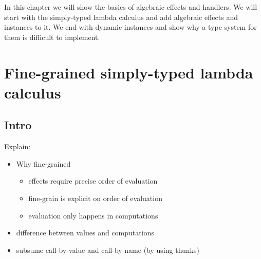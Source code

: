 {
\newcommand\ty[0]{\tau}
\newcommand\tunit[0]{()}
\newcommand\tarr[2]{#1 \rightarrow #2}
\newcommand\thandler[2]{#1 \Rightarrow #2}
\newcommand\tforall[3]{\forall(#1:#2) . #3}

\newcommand\cty[0]{\underline{\ty}}
\newcommand\aty[2]{#1 \; ! \; #2}
\newcommand\texists[3]{\exists(#1:#2) . #3}
\newcommand\texistss[2]{\exists \overrightarrow{#1} . #2}

\newcommand\val[0]{\nu}
\newcommand\vunit[0]{()}
\newcommand\vinst[1]{\mathsf{inst}(#1)}
\newcommand\vabst[3]{\Lambda(#1:#2) . #3}
\newcommand\vabs[2]{\lambda #1 . #2}
\newcommand\vappt[2]{#1 \; [ #2 ]}
\newcommand\vhandler[1]{\textit{handler} \; \{#1\}}
\newcommand\vhandleri[2]{\textit{handler} ( #1 ) \; \{#2\}}
\newcommand\vhandlerc[0]{\vhandler{
	\textit{return} \; x \rightarrow \comp,
	\op_1(x ; k) \rightarrow \comp,
	...,
	\op_n(x ; k) \rightarrow \comp
}}
\newcommand\vhandlerci[1]{\vhandleri{#1}{
	\textit{return} \; x \rightarrow \comp,
	\op_1(x ; k) \rightarrow \comp,
	...,
	\op_n(x ; k) \rightarrow \comp
}}

\newcommand\comp[0]{c}
\newcommand\creturn[1]{\textit{return} \; #1}
\newcommand\capp[2]{#1 \; #2}
\newcommand\cdo[3]{#1 \leftarrow #2 ; #3}
\newcommand\cop[4]{#1(#2 ; #3 . #4)}
\newcommand\copi[5]{#1 \# #2(#3 ; #4 . #5)}
\newcommand\chandle[2]{\textit{with} \; #1 \; \textit{handle} \; #2}
\newcommand\cnew[1]{\textit{new} \; #1}
\newcommand\cunpack[4]{(#1, #2) \leftarrow #3 ; #4}

In this chapter we will show the basics of algebraic effects and handlers. We will start with the simply-typed lambda calculus and add algebraic effects and instances to it. We end with dynamic instances and show why a type system for them is difficult to implement.

\section{Fine-grained simply-typed lambda calculus}

\subsection{Intro}
Explain:
\begin{itemize}
	\item Why fine-grained
	\begin{itemize}
		\item effects require precise order of evaluation
		\item fine-grain is explicit on order of evaluation
		\item evaluation only happens in computations
	\end{itemize}
	\item difference between values and computations
	\item subsume call-by-value and call-by-name (by using thunks)
\end{itemize}

}
